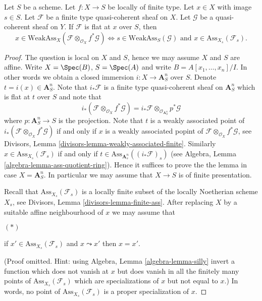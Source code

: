 \begin{lemma}
\label{lemma-bourbaki-finite-type-general-base-at-point}
Let $S$ be a scheme.
Let $f : X \to S$ be locally of finite type.
Let $x \in X$ with image $s \in S$.
Let $\mathcal{F}$ be a finite type quasi-coherent sheaf on $X$.
Let $\mathcal{G}$ be a quasi-coherent sheaf on $Y$.
If $\mathcal{F}$ is flat at $x$ over $S$, then
$$
x \in \text{WeakAss}_X(\mathcal{F} \otimes_{\mathcal{O}_X} f^*\mathcal{G})
\Leftrightarrow
s \in \text{WeakAss}_S(\mathcal{G})
\text{ and }
x \in \text{Ass}_{X_s}(\mathcal{F}_s).
$$
\end{lemma}

\begin{proof}
The question is local on $X$ and $S$, hence we may assume $X$ and $S$
are affine. Write $X = \Spec(B)$, $S = \Spec(A)$ and write
$B = A[x_1, \ldots, x_n]/I$. In other words we obtain a closed immersion
$i : X \to \mathbf{A}^n_S$ over $S$. Denote $t = i(x) \in \mathbf{A}^n_S$.
Note that $i_*\mathcal{F}$ is a finite type quasi-coherent sheaf on
$\mathbf{A}^n_S$ which is flat at $t$ over $S$ and note that
$$
i_*(\mathcal{F} \otimes_{\mathcal{O}_X} f^*\mathcal{G}) =
i_*\mathcal{F} \otimes_{\mathcal{O}_{\mathbf{A}^n_S}} p^*\mathcal{G}
$$
where $p : \mathbf{A}^n_S \to S$ is the projection. Note that
$t$ is a weakly associated point of
$i_*(\mathcal{F} \otimes_{\mathcal{O}_X} f^*\mathcal{G})$
if and only if $x$ is a weakly associated popint of
$\mathcal{F} \otimes_{\mathcal{O}_X} f^*\mathcal{G}$, see
Divisors, Lemma \ref{divisors-lemma-weakly-associated-finite}.
Similarly $x \in \text{Ass}_{X_s}(\mathcal{F}_s)$ if and only
if $t \in \text{Ass}_{\mathbf{A}^n_s}((i_*\mathcal{F})_s)$ (see
Algebra, Lemma \ref{algebra-lemma-ass-quotient-ring}).
Hence it suffices to prove the the lemma in case $X = \mathbf{A}^n_S$.
In particular we may assume that $X \to S$ is of finite presentation.

\medskip\noindent
Recall that $\text{Ass}_{X_s}(\mathcal{F}_s)$ is a locally finite subset
of the locally Noetherian scheme $X_s$, see
Divisors, Lemma \ref{divisors-lemma-finite-ass}.
After replacing $X$ by a suitable affine neighbourhood of $x$ we may
assume that
\begin{list}{$(*)$}{}
\item if $x' \in \text{Ass}_{X_s}(\mathcal{F}_s)$ and $x \leadsto x'$
then $x = x'$.
\end{list}
(Proof omitted. Hint: using
Algebra, Lemma \ref{algebra-lemma-silly}
invert a function which does not vanish at $x$ but does vanish
in all the finitely many points of $\text{Ass}_{X_s}(\mathcal{F}_s)$
which are specializations of $x$ but not equal to $x$.)
In words, no point of $\text{Ass}_{X_s}(\mathcal{F}_s)$
is a proper specialization of $x$.


\end{proof}
